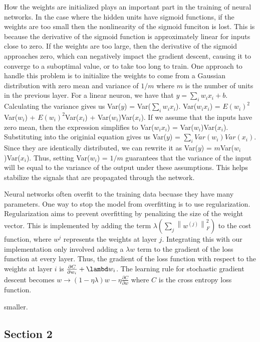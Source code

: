\documentclass[10pt,twoside]{article}
\begin{document}
How the weights are initialized plays an important part in the training of neural networks. In the case where the hidden units have sigmoid functions, if the weights are too small then the nonlinearity of the sigmoid funciton is lost. This is because the derivative of the sigmoid function is approximately linear for inputs close to zero. If the weights are too large, then the derivative of the sigmoid approaches zero, which can negatively impact the gradient descent, causing it to converge to a suboptimal value, or to take too long to train. One approach to handle this problem is to initialize the weights to come from a Gaussian distribution with zero mean and variance of $1/m$ where $m$ is the number of units in the previous layer. For a linear neuron, we have that $y = \sum_i w_i x_i +b$. Calculating the variance gives us Var($y$) = Var($\sum_i w_i x_i$). Var($w_i x_i$) = $E(w_i)^2$Var($w_i$) + $E(w_i)^2$Var($x_i$) + Var($w_i$)Var($x_i$). If we assume that the inputs have zero mean, then the expression simplifies to Var($w_i x_i$) = Var($w_i$)Var($x_i$). Substituting into the originial equation gives us Var($y$) = $\sum_i Var(w_i)Var(x_i)$. Since they are identically distributed, we can rewrite it as Var($y$) = $m$Var($w_i$)Var($x_i$). Thus, setting Var($w_i$) = $1/m$ guarantees that the variance of the input will be equal to the variance of the output under these assumptions. This helps stabilize the signals that are propagated through the network. 

Neural networks often overfit to the training data becuase they have many parameters. One way to stop the model from overfitting is to use regularization. Regularization aims to prevent overfitting by penalizing the size of the weight vector. This is implemented by adding the term $\lambda (\sum_j  \left \|w^{(j)}  \right \|^2_F )$ to the cost function, where $w^{j}$ represents the weights at layer $j$. Integrating this with our implementation only involved adding a $\lambda w$ term to the gradient of the loss function at every layer. Thus, the gradient of the loss function with respect to the weights at layer $i$ is $\frac{\partial C}{\partial w_i} + \lambd w_i$. The learning rule for stochastic gradient descent becomes $w \rightarrow (1- \eta \lambda)w - \eta \frac{\partial C}{\partial w} $ where $C$ is the cross entropy loss function.


\noindent smaller.

\subsection{Section 2}
\end{document}
